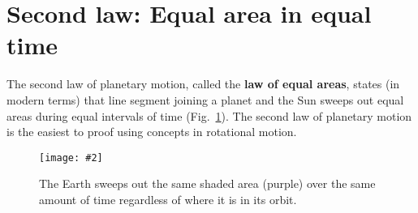 \documentclass[11pt]{article}
\newcommand{\pic}[2]{
  \texttt{[image: \#2]}
}
\begin{document}
\section{Second law: Equal area in equal time}

The second law of planetary motion, called the \textbf{law of equal areas},
states (in modern terms) that line segment joining a planet and the Sun sweeps
out equal areas during equal intervals of time (Fig.~\ref{kep2}). The second
law of planetary motion is the easiest to proof using concepts in rotational
motion.
\begin{figure}[!ht]
  \centering
    \pic{.55}{../201532-132212364-3243-planet.png}
    \caption{The Earth sweeps out the same shaded area (purple) over the
      same amount of time regardless of where it is in its orbit.}
    \label{kep2}
\end{figure}
\end{document}
